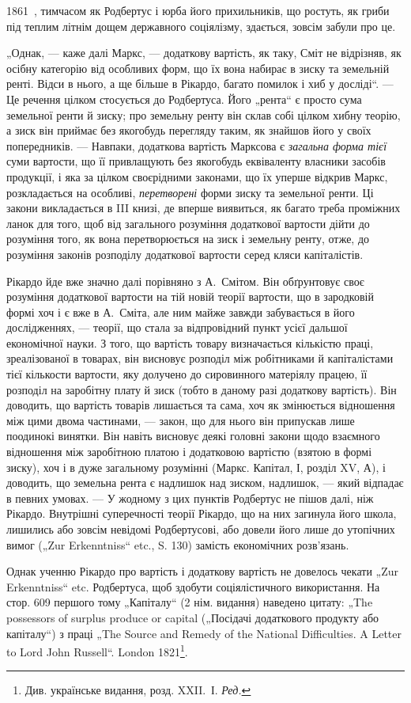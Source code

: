 \parcont{}  %
1861~, тимчасом як Родбертус і юрба його прихильників, що ростуть,
як гриби під теплим літнім дощем державного соціялізму, здається, зовсім
забули про це.

„Однак, — каже далі Маркс, — додаткову вартість, як таку, Сміт не
відрізняв, як осібну категорію від особливих форм, що їх вона набирає
в зиску та земельній ренті. Відси в нього, а ще більше в Рікардо, багато
помилок і хиб у досліді“. — Це речення цілком стосується до Родбертуса.
Його „рента“ є просто сума земельної ренти й зиску; про земельну
ренту він склав собі цілком хибну теорію, а зиск він приймає без якогобудь
перегляду таким, як знайшов його у своїх попередників. — Навпаки,
додаткова вартість Марксова є \emph{загальна форма тієї} суми вартости, що
її привлащують без якогобудь еквіваленту власники засобів продукції,
і яка за цілком своєрідними законами, що їх уперше відкрив Маркс,
розкладається на особливі, \emph{перетворені} форми зиску та земельної ренти.
Ці закони викладається в III книзі, де вперше виявиться, як багато треба
проміжних ланок для того, щоб від загального розуміння додаткової
вартости дійти до розуміння того, як вона перетворюється на зиск і
земельну ренту, отже, до розуміння законів розподілу додаткової вартости
серед кляси капіталістів.

Рікардо йде вже значно далі порівняно з А.~Смітом. Він обґрунтовує
своє розуміння додаткової вартости на тій новій теорії вартости, що в
зародковій формі хоч і є вже в А.~Сміта, але ним майже завжди забувається
в його дослідженнях, — теорії, що стала за відпровідний пункт
усієї дальшої економічної науки. З того, що вартість товару визначається
кількістю праці, зреалізованої в товарах, він висновує розподіл між
робітниками й капіталістами тієї кількости вартости, яку долучено до
сировинного матеріялу працею, її розподіл на заробітну плату й зиск
(тобто в даному разі додаткову вартість). Він доводить, що вартість
товарів лишається та сама, хоч як змінюється відношення між цими двома
частинами, — закон, що для нього він припускав лише поодинокі винятки.
Він навіть висновує деякі головні закони щодо взаємного відношення між
заробітною платою і додатковою вартістю (взятою в формі зиску), хоч і в
дуже загальному розумінні (Маркс. Капітал, І, розділ XV, А), і доводить, що
земельна рента є надлишок над зиском, надлишок, — який відпадає в певних
умовах. — У жодному з цих пунктів Родбертус не пішов далі, ніж Рікардо.
Внутрішні суперечності теорії Рікардо, що на них загинула його школа, лишились
або зовсім невідомі Родбертусові, або довели його лише до утопічних
вимог („Zur Erkenntniss“ etc., S. 130) замість економічних розв’язань.

Однак ученню Рікардо про вартість і додаткову вартість не довелось
чекати „Zur Erkenntniss“ etc. Родбертуса, щоб здобути соціялістичного
використання. На стор. 609 першого тому „Капіталу“ (2 нім. видання)
наведено цитату: „The possessors of surplus produce or capital („Посідачі
додаткового продукту або капіталу“) з праці „The Source and Remedy of
the National Difficulties. A Letter to Lord John Russell“. London 1821\footnote*{
Див. українське видання, розд. XXII.~І. \emph{Ред.}
}.
\parbreak{}  %
